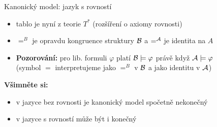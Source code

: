 \documentclass{beamer}
\begin{document}
\begin{frame}{Kanonický model: jazyk s rovností}

    \pause

    \medskip

    \pause
    \begin{itemize}
        \item tablo je nyní z teorie $T^*$ (rozšíření o axiomy rovnosti)\pause
        \item $=^B$ je opravdu kongruence struktury $\mathcal{B}$ a $=^{\mathcal{A}}$ je identita na $A$\pause
        \item \textbf{Pozorování:} pro lib. formuli $\varphi$ platí \alert{$\mathcal{B}\models\varphi$ právě když $\mathcal{A}\models\varphi$}\\
        (symbol $=$ interpretujeme jako $=^B$ v $\mathcal{B}$ a jako identitu v $\mathcal{A}$)\pause
    \end{itemize}

    \textbf{Všimněte si:}\pause
    \begin{itemize}
        \item v jazyce bez rovnosti je kanonický model spočetně nekonečný\pause
        \item v jazyce s rovností může být i konečný
    \end{itemize}

\end{frame}
\end{document}

